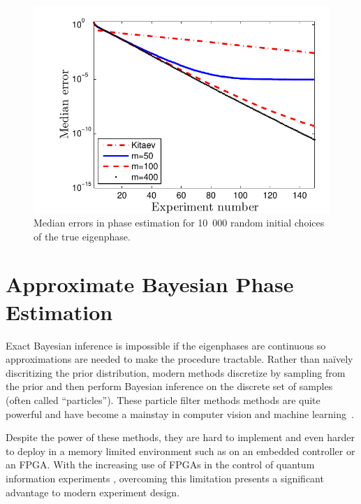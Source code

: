 \documentclass[aps,pra,amsmath,twocolumn,amssymb,superscriptaddress]{revtex4-1}
\begin{document}
\begin{figure}[t!]
    \begin{centering}
        \includegraphics[width=0.8\linewidth]{PEerror.pdf}
    \end{centering}
    \caption{\label{fig:PEerror}
     Median errors in phase estimation for 10~000 random initial choices of the true eigenphase.
    }
\end{figure}





\section{Approximate Bayesian Phase Estimation}

Exact Bayesian inference is impossible if the eigenphases are
continuous so approximations are needed to
make the procedure tractable.  Rather than na\"ively discritizing the prior
distribution, modern methods discretize by sampling from the prior and
then perform Bayesian inference on the discrete set of samples (often called
``particles'').  These particle filter methods methods are quite powerful and
have become a mainstay in computer vision and machine
learning~\cite{haykin2004kalman,smith2013sequential,isard_condensationconditional_1998}.


Despite the power of these methods, they are hard to implement and even
harder to deploy in a memory limited environment such as on an embedded
controller or an FPGA. With the increasing use of FPGAs in the control of
quantum information experiments
\cite{shulman_suppressing_2014,casagrande_design_2014,hornibrook_cryogenic_2015},
overcoming this limitation presents a
significant advantage to modern experiment design. 
\end{document}
